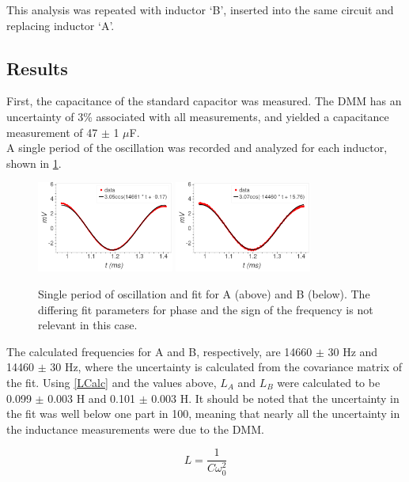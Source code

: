 \documentclass[aps,prl,reprint]{revtex4-2}
\begin{document}
This analysis was repeated with inductor `B', inserted into the same circuit
and replacing inductor `A'.

\subsection{Results}

First, the capacitance of the standard capacitor was measured. The DMM has an
uncertainty of 3\% associated with all measurements, and yielded a capacitance
measurement of 47 $\pm$ 1 $\mu$F. \\

A single period of the oscillation was recorded and analyzed for each inductor,
shown in \ref{single_period}. 

\begin{figure}[h]
\includegraphics[width=0.4\textwidth]{../Images/l6_channel_A_one_period_fit.png}
\includegraphics[width=0.4\textwidth]{../Images/l6_channel_B_one_period_fit.png}
\caption{\label{single_period} Single period of oscillation and fit for A (above) and B
(below). The differing fit parameters for phase and the sign of the frequency is not
relevant in this case. }
\end{figure}

\newpage
The calculated frequencies for A and B, respectively, are 14660 $\pm$ 30 Hz and
14460 $\pm$ 30 Hz, where the uncertainty is calculated from the covariance
matrix of the fit. Using \ref{LCalc} and the values above, $L_A$ and $L_B$ were
calculated to be 0.099 $\pm$ 0.003 H and 0.101 $\pm$ 0.003 H. It should be noted
that the uncertainty in the fit was well below one part in 100, meaning that
nearly all the uncertainty in the inductance measurements were due to the DMM.

\begin{equation} 
	L = \frac{1}{C\omega_0^2}
	\label{LCalc}
\end{equation}
\end{document}

